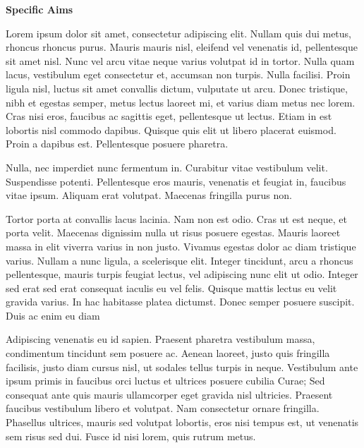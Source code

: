 \documentclass[11pt]{report}
\begin{document}
\textbf{Specific Aims}

Lorem ipsum dolor sit amet, consectetur adipiscing elit. Nullam quis
dui metus, rhoncus rhoncus purus. Mauris mauris nisl, eleifend vel
venenatis id, pellentesque sit amet nisl. Nunc vel arcu vitae neque
varius volutpat id in tortor. Nulla quam lacus, vestibulum eget
consectetur et, accumsan non turpis. Nulla facilisi. Proin ligula
nisl, luctus sit amet convallis dictum, vulputate ut arcu. Donec
tristique, nibh et egestas semper, metus lectus laoreet mi, et varius
diam metus nec lorem. Cras nisi eros, faucibus ac sagittis eget,
pellentesque ut lectus. Etiam in est lobortis nisl commodo dapibus.
Quisque quis elit ut libero placerat euismod. Proin a dapibus est.
Pellentesque posuere pharetra.

Nulla, nec imperdiet nunc fermentum in. Curabitur vitae vestibulum
velit. Suspendisse potenti. Pellentesque eros mauris, venenatis et
feugiat in, faucibus vitae ipsum. Aliquam erat volutpat. Maecenas
fringilla purus non.

Tortor porta at convallis lacus lacinia. Nam non est odio. Cras ut est
neque, et porta velit. Maecenas dignissim nulla ut risus posuere
egestas. Mauris laoreet massa in elit viverra varius in non justo.
Vivamus egestas dolor ac diam tristique varius. Nullam a nunc ligula,
a scelerisque elit. Integer tincidunt, arcu a rhoncus pellentesque,
mauris turpis feugiat lectus, vel adipiscing nunc elit ut odio.
Integer sed erat sed erat consequat iaculis eu vel felis. Quisque
mattis lectus eu velit gravida varius. In hac habitasse platea
dictumst. Donec semper posuere suscipit. Duis ac enim eu diam

Adipiscing venenatis eu id sapien. Praesent pharetra vestibulum massa,
condimentum tincidunt sem posuere ac. Aenean laoreet, justo quis
fringilla facilisis, justo diam cursus nisl, ut sodales tellus turpis
in neque. Vestibulum ante ipsum primis in faucibus orci luctus et
ultrices posuere cubilia Curae; Sed consequat ante quis mauris
ullamcorper eget gravida nisl ultricies. Praesent faucibus vestibulum
libero et volutpat. Nam consectetur ornare fringilla. Phasellus
ultrices, mauris sed volutpat lobortis, eros nisi tempus est, ut
venenatis sem risus sed dui. Fusce id nisi lorem, quis rutrum metus.
\end{document}
